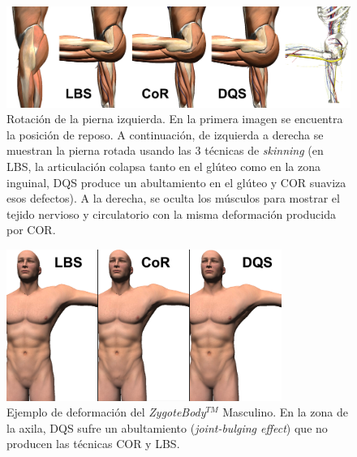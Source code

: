 \begin{figure}[ht]%
  \centering
  \includegraphics[width=\textwidth]{IMG/compculo}
    \caption{ Rotación de la pierna izquierda. En la primera imagen se encuentra la posición de reposo. A continuación, de izquierda a derecha se muestran la pierna rotada usando las 3 técnicas de \emph{skinning} (en \acs{LBS}, la articulación colapsa tanto en el glúteo como en la zona inguinal, \acs{DQS} produce un abultamiento en el glúteo y \acs{COR} suaviza esos defectos). A la derecha, se oculta los músculos para mostrar el tejido nervioso y circulatorio con la misma deformación producida por \acs{COR}.}
    \label{fig:thigh_bending}
\end{figure}

\begin{figure}[ht]%
  \centering
  \includegraphics[width=0.8\textwidth]{IMG/sobaco.png}
    \caption{Ejemplo de deformación del  \emph{ZygoteBody}$^{TM}$ Masculino. En la zona de la axila, \acs{DQS} sufre un abultamiento (\emph{joint-bulging effect}) que no producen las técnicas \acs{COR} y \acs{LBS}. }
    \label{fig:axila}
\end{figure}






